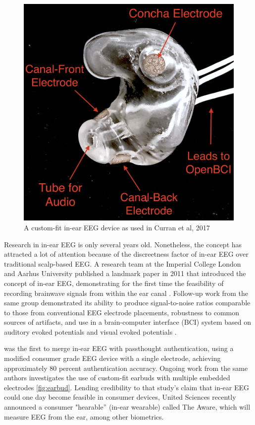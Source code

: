 \documentclass[sigconf]{acmart}
\begin{document}
\label{fig:earbud}
\begin{figure}[t!]
\centering
\includegraphics[width=.9\linewidth]{./figures/custom-fit-eeg-annotated.jpg}
\caption{A custom-fit in-ear EEG device as used in Curran et al, 2017}
\end{figure}

Research in in-ear EEG is only several years old. Nonetheless, the concept has
attracted a lot of attention because of the discreetness factor of in-ear EEG over
traditional scalp-based EEG. A research team at the Imperial College London
and Aarhus University published a landmark paper in 2011 that introduced the
concept of in-ear EEG, demonstrating for the first time the feasibility of recording
brainwave signals from within the ear canal
\cite{Looney2011}.
Follow-up work from the same
group demonstrated its ability to produce signal-to-noise ratios comparable to
those from conventional EEG electrode placements, robustness to common
sources of artifacts, and use in a brain-computer interface (BCI) system based on
auditory evoked potentials and visual evoked potentials
\cite{Looney2012a,Kidmose2013a,Kidmose2013b}.


\cite{curranpassthoughts} was the first to merge in-ear EEG with passthought authentication,
 using a modified consumer grade EEG device with a single electrode, achieving approximately 80 percent authentication accuracy. 
Ongoing work from the same authors investigates the use of custom-fit earbuds with multiple embedded electrodes \ref{fig:earbud}.
Lending credibility to that study's claim that in-ear EEG could one day become feasible in consumer devices,
United Sciences recently announced a consumer "hearable'' (in-ear wearable) called The Aware, which will measure EEG from the ear, among other biometrics.
\end{document}
